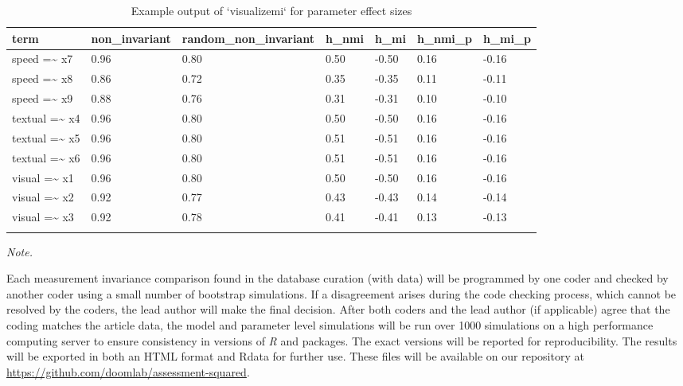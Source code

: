 \documentclass[
  english,
  man]{apa7}
\begin{document}
\begin{table}[tbp]

\begin{center}
\begin{threeparttable}

\caption{\label{tab:table-2-example}Example output of `visualizemi` for parameter effect sizes}

\begin{tabular}{lllllll}
\toprule
term & \multicolumn{1}{c}{non\_invariant} & \multicolumn{1}{c}{random\_non\_invariant} & \multicolumn{1}{c}{h\_nmi} & \multicolumn{1}{c}{h\_mi} & \multicolumn{1}{c}{h\_nmi\_p} & \multicolumn{1}{c}{h\_mi\_p}\\
\midrule
speed =\textasciitilde{} x7 & 0.96 & 0.80 & 0.50 & -0.50 & 0.16 & -0.16\\
speed =\textasciitilde{} x8 & 0.86 & 0.72 & 0.35 & -0.35 & 0.11 & -0.11\\
speed =\textasciitilde{} x9 & 0.88 & 0.76 & 0.31 & -0.31 & 0.10 & -0.10\\
textual =\textasciitilde{} x4 & 0.96 & 0.80 & 0.50 & -0.50 & 0.16 & -0.16\\
textual =\textasciitilde{} x5 & 0.96 & 0.80 & 0.51 & -0.51 & 0.16 & -0.16\\
textual =\textasciitilde{} x6 & 0.96 & 0.80 & 0.51 & -0.51 & 0.16 & -0.16\\
visual =\textasciitilde{} x1 & 0.96 & 0.80 & 0.50 & -0.50 & 0.16 & -0.16\\
visual =\textasciitilde{} x2 & 0.92 & 0.77 & 0.43 & -0.43 & 0.14 & -0.14\\
visual =\textasciitilde{} x3 & 0.92 & 0.78 & 0.41 & -0.41 & 0.13 & -0.13\\
\bottomrule
\addlinespace
\end{tabular}

\begin{tablenotes}[para]
\normalsize{\textit{Note.} }
\end{tablenotes}

\end{threeparttable}
\end{center}

\end{table}

Each measurement invariance comparison found in the database curation (with data) will be programmed by one coder and checked by another coder using a small number of bootstrap simulations. If a disagreement arises during the code checking process, which cannot be resolved by the coders, the lead author will make the final decision. After both coders and the lead author (if applicable) agree that the coding matches the article data, the model and parameter level simulations will be run over 1000 simulations on a high performance computing server to ensure consistency in versions of \emph{R} and packages. The exact versions will be reported for reproducibility. The results will be exported in both an HTML format and Rdata for further use. These files will be available on our repository at \url{https://github.com/doomlab/assessment-squared}.
\end{document}
